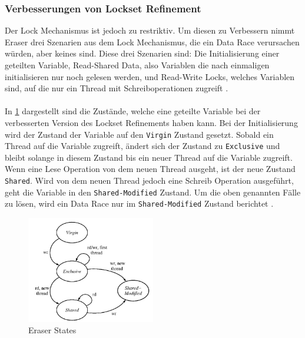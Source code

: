 \subsubsection*{Verbesserungen von Lockset Refinement}

Der Lock Mechanismus ist jedoch zu restriktiv. Um diesen zu Verbessern nimmt Eraser drei Szenarien aus dem Lock Mechanismus, die ein Data Race verursachen würden, aber keines sind. Diese drei Szenarien sind: Die Initialisierung einer geteilten Variable, Read-Shared Data, also Variablen die nach einmaligen initialisieren nur noch gelesen werden, und Read-Write Locks, welches Variablen sind, auf die nur ein Thread mit Schreiboperationen zugreift \cite[vgl.][396-397]{savage_eraser_nodate}. \\
\\
In \ref{fig:eraserState} dargestellt sind die Zustände, welche eine geteilte Variable bei der verbesserten Version des Lockset Refinements haben kann. Bei der Initialisierung wird der Zustand der Variable auf den \texttt{Virgin} Zustand gesetzt. Sobald ein Thread auf die Variable zugreift, ändert sich der Zustand zu \texttt{Exclusive} und bleibt solange in diesem Zustand bis ein neuer Thread auf die Variable zugreift. Wenn eine Lese Operation von dem neuen Thread ausgeht, ist der neue Zustand \texttt{Shared}. Wird von dem neuen Thread jedoch eine Schreib Operation ausgeführt, geht die Variable in den \texttt{Shared-Modified} Zustand. Um die oben genannten Fälle zu lösen, wird ein Data Race nur im \texttt{Shared-Modified} Zustand berichtet \cite[vgl.][397-399]{savage_eraser_nodate}.   

\begin{figure}[ht]
    \centering
    \includegraphics[width=0.5\textwidth]{gfx/eraser_state.png}
    \caption{Eraser States \cite[389]{savage_eraser_nodate}}
    \label{fig:eraserState}
\end{figure}

